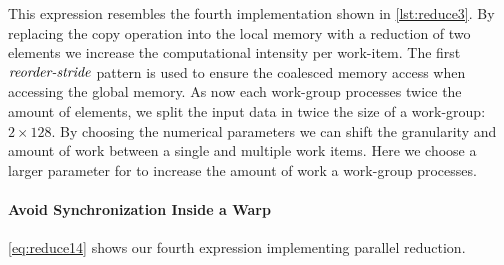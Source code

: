 %
This expression resembles the fourth implementation shown in \autoref{lst:reduce3}.
By replacing the copy operation into the local memory with a reduction of two elements we increase the computational intensity per work-item.
The first $\text{\textit{reorder-stride}}$ pattern is used to ensure the coalesced memory access when accessing the global memory.
As now each work-group processes twice the amount of elements, we split the input data in twice the size of a work-group: $2\times 128$.
By choosing the numerical parameters we can shift the granularity and amount of work between a single and multiple work items.
Here we choose a larger parameter for \splitN to increase the amount of work a work-group processes.

\paragraph{Avoid Synchronization Inside a Warp}
\autoref{eq:reduce14} shows our fourth expression implementing parallel reduction.
